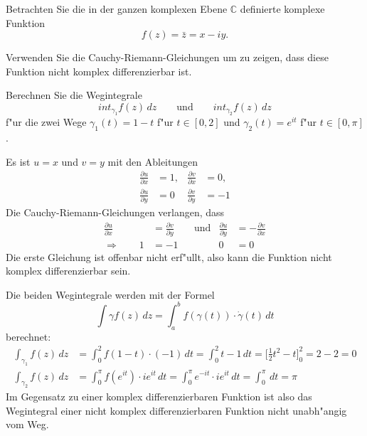 Betrachten Sie die in der ganzen komplexen Ebene $\mathbb C$ definierte
komplexe Funktion
\[
f(z)=\bar z=x-iy.
\]
\begin{teilaufgaben}
\item
Verwenden Sie die Cauchy-Riemann-Gleichungen um zu zeigen, dass diese
Funktion nicht komplex differenzierbar ist.
\item
Berechnen Sie die Wegintegrale
\[
int_{\gamma_1}f(z)\,dz
\qquad\text{und}\qquad
int_{\gamma_2}f(z)\,dz
\]
f"ur die zwei Wege $\gamma_1(t)=1-t$ f"ur $t\in[0,2]$ und 
$\gamma_2(t)=e^{it}$ f"ur $t\in[0,\pi]$.
\end{teilaufgaben}

\begin{loesung}
\begin{teilaufgaben}
\item
Es ist $u=x$ und $v=y$ mit den Ableitungen
\[
\begin{aligned}
\frac{\partial u}{\partial x}&=1,&
\frac{\partial v}{\partial x}&=0,\\
\frac{\partial u}{\partial y}&=0&
\frac{\partial v}{\partial y}&=-1
\end{aligned}
\]
Die Cauchy-Riemann-Gleichungen verlangen, dass
\[
\begin{aligned}
\frac{\partial u}{\partial x}&=\frac{\partial v}{\partial y}
&&\text{und}&
\frac{\partial u}{\partial y}&=-\frac{\partial v}{\partial x}
\\
\Rightarrow\qquad
1&=-1&&&0&=0
\end{aligned}
\]
Die erste Gleichung ist offenbar nicht erf"ullt, also kann die Funktion
nicht komplex differenzierbar sein.
\item
Die beiden Wegintegrale werden mit der Formel
\[
\int\gamma f(z)\,dz = \int_a^b f(\gamma(t))\cdot \dot\gamma(t)\,dt
\]
berechnet:
\begin{align*}
\int_{\gamma_1}f(z) \,dz
&=
\int_0^2 f(1-t)\cdot (-1)\,dt
=
\int_0^2 t-1\,dt
=
\biggl[\frac12t^2-t\biggl]_0^2
=
2-2=0
\\
\int_{\gamma_2}f(z) \,dz
&=
\int_0^\pi f(e^{it})\cdot ie^{it}\,dt
=
\int_0^\pi e^{-it}\cdot ie^{it}\,dt
=
\int_0^\pi \,dt
=
\pi
\end{align*}
Im Gegensatz zu einer komplex differenzierbaren Funktion ist also das
Wegintegral einer nicht komplex differenzierbaren Funktion nicht
unabh"angig vom Weg.
\qedhere
\end{teilaufgaben}
\end{loesung}

